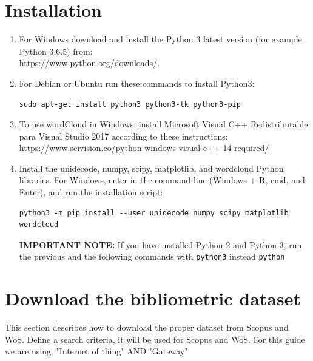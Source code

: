 \documentclass[10pt,letterpaper]{article}
\begin{document}
\section{Installation}

\begin{enumerate}
\item For Windows download and install the Python 3 latest version (for example Python 3.6.5) from: \\ \url{https://www.python.org/downloads/}.
\item For Debian or Ubuntu run these commands to install Python3: 
\begin{verbatim}
sudo apt-get install python3 python3-tk python3-pip
\end{verbatim}

\item To use wordCloud in Windows, install Microsoft Visual C++ Redistributable para Visual Studio 2017 according to these instructions: \url{https://www.scivision.co/python-windows-visual-c++-14-required/}

\item Install the unidecode, numpy, scipy, matplotlib, and wordcloud Python libraries. For Windows, enter in the command line (Windows + R, cmd, and Enter), and run the installation script:
\begin{verbatim}
python3 -m pip install --user unidecode numpy scipy matplotlib wordcloud
\end{verbatim}

\textbf{IMPORTANT NOTE:} If you have installed Python 2 and Python 3, run the previous and the following commands with \verb|python3| instead \verb|python|
\end{enumerate}

\section{Download the bibliometric dataset}
This section describes how to download the proper dataset from Scopus and WoS. Define a search criteria, it will be used for Scopus and WoS. For this guide we are using: "Internet of thing"  AND  "Gateway" 
\end{document}
